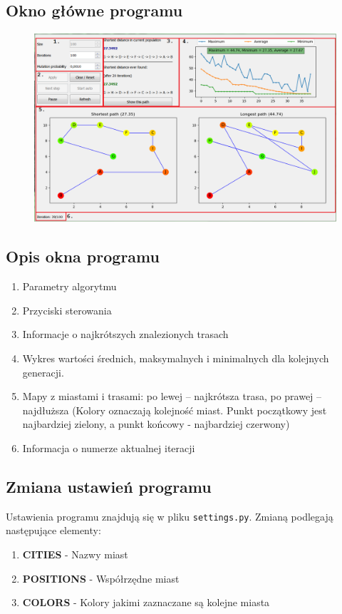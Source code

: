 \documentclass[a4paper,11pt]{article}
\begin{document}
		\subsection{Okno główne programu}
			\begin{figure}[H]
				\centering
				\includegraphics[scale=0.55]{main_window2.png}
			\end{figure}
		
		\subsection{Opis okna programu}
			\begin{enumerate}
				\item Parametry algorytmu
				\item Przyciski sterowania
				\item Informacje o najkrótszych znalezionych trasach
				\item Wykres wartości średnich, maksymalnych i minimalnych dla kolejnych generacji.
				\item Mapy z miastami i trasami: po lewej -- najkrótsza trasa, po prawej -- najdłuższa (Kolory oznaczają kolejność miast. Punkt początkowy jest najbardziej zielony, a punkt końcowy - najbardziej czerwony)
				\item Informacja o numerze aktualnej iteracji
			\end{enumerate}
		
		\subsection{Zmiana ustawień programu}
			Ustawienia programu znajdują się w pliku \texttt{settings.py}. Zmianą podlegają następujące elementy:
			\begin{enumerate}
				\item \textbf{CITIES} - Nazwy miast
				\item \textbf{POSITIONS} - Współrzędne miast
				\item \textbf{COLORS} - Kolory jakimi zaznaczane są kolejne miasta
			\end{enumerate}
	
\end{document}
